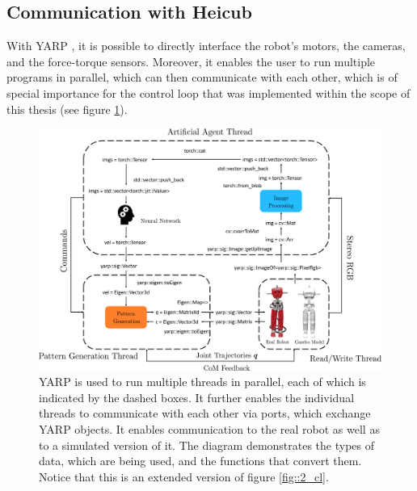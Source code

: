 \FloatBarrier
\subsection{Communication with Heicub}
\label{sec::342_co}
With YARP \cite{metta2006yarp}, it is possible to directly interface the robot's motors, the cameras, and the force-torque sensors. Moreover, it enables the user to run multiple programs in parallel, which can then communicate with each other, which is of special importance for the control loop that was implemented within the scope of this thesis (see figure \ref{fig::341_yarp}).
\begin{figure}[h!]
	\hspace*{-1cm}
	\includegraphics[scale=.4]{chapters/03_methods/img/yarp_diag.png}
	\caption{YARP is used to run multiple threads in parallel, each of which is indicated by the dashed boxes. It further enables the individual threads to communicate with each other via ports, which exchange YARP objects. It enables communication to the real robot as well as to a simulated version of it. The diagram demonstrates the types of data, which are being used, and the functions that convert them. Notice that this is an extended version of figure \ref{fig::2_cl}.}
	\label{fig::341_yarp}
\end{figure}
